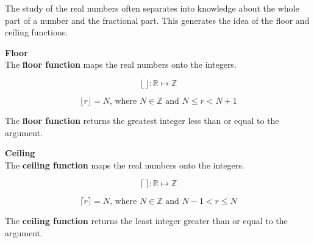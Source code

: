 \documentclass{ximera}
\author{Alan Yang}
\begin{document}
The study of the real numbers often separates into knowledge about the whole part of a number and the fractional part.  This generates the idea of the floor and ceiling functions.





\begin{definition}  \textbf{\textcolor{green!50!black}{Floor}} \\

The \textbf{floor function} maps the real numbers onto the integers.

\[
\lfloor \, \rfloor : \mathbb{R} \mapsto \mathbb{Z}
\]


\[
\lfloor r \rfloor = N \text{, where } N \in \mathbb{Z} \text{ and } N \leq r < N+1  
\]


The \textbf{floor function} returns the greatest integer less than or equal to the argument.

\end{definition}








\begin{definition}  \textbf{\textcolor{green!50!black}{Ceiling}} \\

The \textbf{ceiling function} maps the real numbers onto the integers.

\[
\lceil \, \rceil : \mathbb{R} \mapsto \mathbb{Z}
\]


\[
\lceil r \rceil = N \text{, where } N \in \mathbb{Z} \text{ and } N-1 < r \leq N  
\]


The \textbf{ceiling function} returns the least integer greater than or equal to the argument.

\end{definition}
\end{document}
